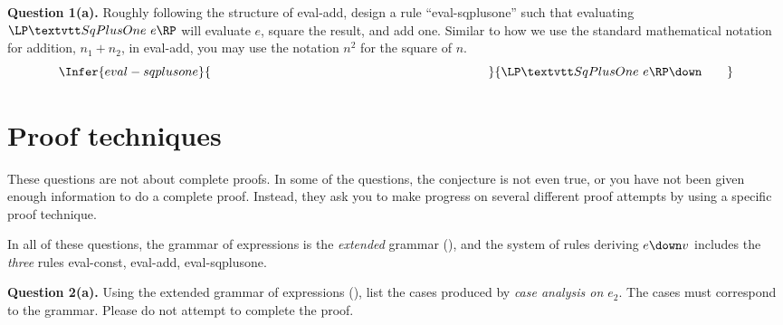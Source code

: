 \vspace*{-1.2ex}

{\noindent \textbf{Question 1(a).}}
Roughly following the structure of eval-add, design a rule ``eval-sqplusone'' such that
evaluating $\sqplusoneexp{e}$ will evaluate $e$, square the result, and add one.  Similar to how we use the
standard mathematical notation for addition, $n_1 + n_2$, in eval-add, you may use the notation $n^2$ for the square of $n$.
\[
     \Infer{eval-sqplusone}
           {
              \hspace*{220pt}
           }
           {
             \sqplusoneexp{e} \down
           \hspace*{20pt}
          }
\]

\clearpage

\section{Proof techniques}

These questions are not about complete proofs.
In some of the questions, the conjecture is not even true, or you
have not been given enough information to do a complete proof.
Instead, they ask you to make progress on several different proof attempts
by using a specific proof technique.

In all of these questions, the grammar of expressions is the \emph{extended}
grammar (), and the system of rules deriving $e \down v$ includes the \emph{three} rules eval-const, eval-add, eval-sqplusone.

\textbf{Question 2(a).}
Using the extended grammar of expressions (),
list the cases produced by \emph{case analysis on $e_2$}.
The cases must correspond to the grammar.
Please do not attempt to complete the proof.


